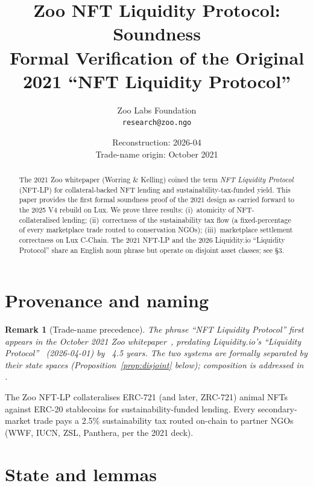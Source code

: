 \documentclass[11pt]{article}
\title{Zoo NFT Liquidity Protocol: Soundness\\
{\large Formal Verification of the Original 2021 ``NFT Liquidity
Protocol''}}
\author{Zoo Labs Foundation\\
\texttt{research@zoo.ngo}}
\date{Reconstruction: 2026-04 \\ Trade-name origin: October 2021}
\newtheorem{remark}{Remark}
\begin{document}
\maketitle

\begin{abstract}
The 2021 Zoo whitepaper (Worring \& Kelling) coined the term
\emph{NFT Liquidity Protocol} (NFT-LP) for collateral-backed NFT
lending and sustainability-tax-funded yield. This paper provides
the first formal soundness proof of the 2021 design as carried
forward to the 2025 V4 rebuild on Lux. We prove three results:
(i)~atomicity of NFT-collateralised lending; (ii)~correctness of the
sustainability tax flow (a fixed-percentage of every marketplace
trade routed to conservation NGOs); (iii)~marketplace settlement
correctness on Lux C-Chain. The 2021 NFT-LP and the 2026 Liquidity.io
``Liquidity Protocol'' share an English noun phrase but operate on
disjoint asset classes; see \cite{zoo-adopts} \S3.
\end{abstract}

\tableofcontents

\section{Provenance and naming}
\label{sec:naming}

\begin{remark}[Trade-name precedence]
The phrase ``NFT Liquidity Protocol'' first appears in the
October 2021 Zoo whitepaper~\cite{zoo-2021}, predating Liquidity.io's
``Liquidity Protocol''~\cite{liquidity-lp} (2026-04-01) by ~4.5
years. The two systems are formally separated by their state
spaces (Proposition~\ref{prop:disjoint} below); composition is
addressed in \cite{zoo-adopts}.
\end{remark}

The Zoo NFT-LP collateralises ERC-721 (and later, ZRC-721) animal
NFTs against ERC-20 stablecoins for sustainability-funded lending.
Every secondary-market trade pays a 2.5\% sustainability tax routed
on-chain to partner NGOs (WWF, IUCN, ZSL, Panthera, per the
2021 deck).

\section{State and lemmas}
\label{sec:state}
\end{document}
